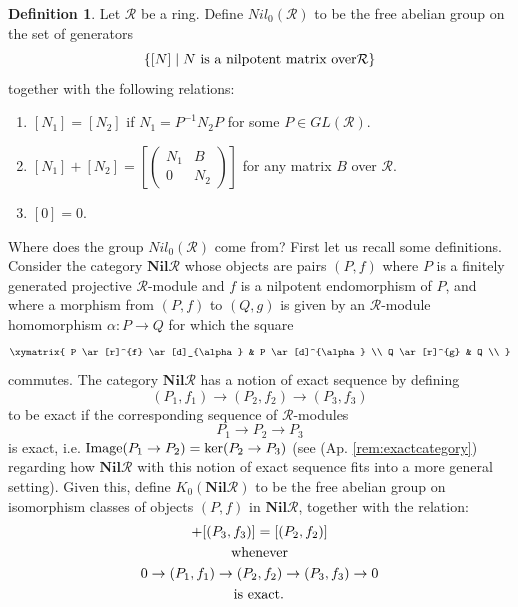 \documentclass{amsart}
\newcommand{\si}{\index}
\theoremstyle{definition}
\newtheorem{de}[equation]{Definition}
\theoremstyle{definition}
\newcommand{\apr}{(Ap. \ref}
\newcommand{\calR}{\mathcal{R}}
\newcommand{\image}{\textnormal{Image}}
\numberwithin{equation}{subsection}
\begin{document}
\begin{de}\label{def:nil0def1}
Let $\calR$ be a ring. Define $Nil_{0}(\calR)$\si{$Nil_{0}$ of a ring} to be the free abelian group on the set of generators
$$\{[N] \mid N {\it  \textnormal{ is a nilpotent matrix over} } \calR\}$$
together with the following relations:
\begin{enumerate}
\item
$[N_{1}] = [N_{2}]$ if $N_{1} = P^{-1}N_{2}P$ for some $P \in GL(\calR)$.
\vspace{.07in}
\item
$[N_{1}] + [N_{2}] = \left[ \begin{pmatrix} N_{1} & B \\ 0 & N_{2} \end{pmatrix} \right]$ for any matrix $B$ over $\calR$.
\vspace{.07in}
\item
$[0] = 0$.
\end{enumerate}
\end{de}
Where does the group $Nil_{0}(\calR)$ come from? First let us recall some definitions.
Consider the category $\textbf{Nil}\calR$ whose objects are pairs $(P,f)$ where $P$ is a finitely generated projective $\calR$-module and $f$ is a nilpotent endomorphism of $P$, and where a morphism from $(P,f)$ to $(Q,g)$ is given by an $\calR$-module homomorphism $\alpha \colon P \to Q$ for which the square
\[
\xymatrix{
P \ar[r]^{f} \ar[d]_{\alpha} & P \ar[d]^{\alpha} \\
Q \ar[r]^{g} & Q \\
}
\]
commutes. The category $\textbf{Nil}\calR$ has a notion of exact sequence by defining
$$(P_{1},f_{1}) \to (P_{2},f_{2}) \to (P_{3},f_{3})$$
to be exact if the corresponding sequence of $\calR$-modules
$$P_{1} \to P_{2} \to P_{3}$$
is exact, i.e. $\image(P_{1} \to P_{2}) = \ker(P_{2} \to P_{3})$ (see \apr{rem:exactcategory}) regarding how $\textbf{Nil}\calR$ with this notion of exact sequence fits into a more general setting). Given this, define $K_{0}(\textbf{Nil}\calR)$ to be the free abelian group on isomorphism classes of objects $(P,f)$ in $\textbf{Nil}\calR$, together with the relation:
\begin{gather*}
[(P_{1},f_{1})] + [(P_{3},f_{3})] = [(P_{2},f_{2})] \\
\textnormal{ whenever } \\
0 \to (P_{1},f_{1}) \to (P_{2},f_{2}) \to (P_{3},f_{3}) \to 0\\
\textnormal{ is exact. }
\end{gather*}
\end{document}
